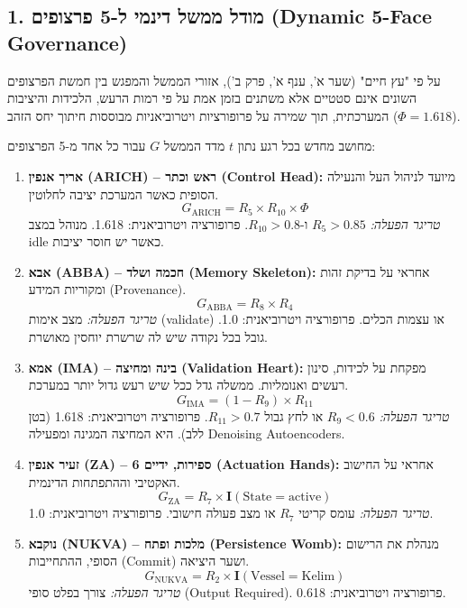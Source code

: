 \documentclass{article}
\begin{document}
\subsection{1. מודל ממשל דינמי ל-5 פרצופים (Dynamic 5-Face Governance)}
על פי "עץ חיים" (שער א', ענף א', פרק ב'), אזורי הממשל והמפגש בין חמשת הפרצופים השונים אינם סטטיים אלא משתנים בזמן אמת על פי רמות הרעש, הלכידות והיציבות המערכתית, תוך שמירה על פרופורציות ויטרוביאניות מבוססות חיתוך יחס הזהב ($\Phi = 1.618$).

מחושב מחדש בכל רגע נתון $t$ מדד הממשל $G$ עבור כל אחד מ-5 הפרצופים:

\begin{enumerate}
    \item \textbf{אריך אנפין (ARICH) -- ראש וכתר (Control Head):}
    מיועד לניהול העל והנעילה הסופית כאשר המערכת יציבה לחלוטין.
    \[ G_{\text{ARICH}} = R_5 \times R_{10} \times \Phi \]
    \textit{טריגר הפעלה:} $R_5 > 0.85$ ו-$R_{10} > 0.8$. פרופורציה ויטרוביאנית: 1.618. מנוהל במצב idle כאשר יש חוסר יציבות.

    \item \textbf{אבא (ABBA) -- חכמה ושלד (Memory Skeleton):}
    אחראי על בדיקת זהות ומקוריות המידע (Provenance).
    \[ G_{\text{ABBA}} = R_8 \times R_4 \]
    \textit{טריגר הפעלה:} מצב אימות (validate) או עצמות הכלים. פרופורציה ויטרוביאנית: 1.0. גובל בכל נקודה שיש לה שרשרת יוחסין מאושרת.

    \item \textbf{אמא (IMA) -- בינה ומחיצה (Validation Heart):}
    מפקחת על לכידות, סינון רעשים ואנומליות. ממשלה גדל ככל שיש רעש גדול יותר במערכת.
    \[ G_{\text{IMA}} = (1 - R_9) \times R_{11} \]
    \textit{טריגר הפעלה:} $R_9 < 0.6$ או לחץ גבול $R_{11} > 0.7$. פרופורציה ויטרוביאנית: 1.618 (בטן ללב). היא המחיצה המגינה ומפעילה Denoising Autoencoders.

    \item \textbf{זעיר אנפין (ZA) -- 6 ספירות, ידיים (Actuation Hands):}
    אחראי על החישוב האקטיבי וההתפתחות הדינמית.
    \[ G_{\text{ZA}} = R_7 \times \mathbf{I}(\text{State} = \text{active}) \]
    \textit{טריגר הפעלה:} עומס קריטי $R_7$ או מצב פעולה חישובי. פרופורציה ויטרוביאנית: 1.0.

    \item \textbf{נוקבא (NUKVA) -- מלכות ופתח (Persistence Womb):}
    מנהלת את הרישום הסופי, ההתחייבות (Commit) ושער היציאה.
    \[ G_{\text{NUKVA}} = R_2 \times \mathbf{I}(\text{Vessel} = \text{Kelim}) \]
    \textit{טריגר הפעלה:} צורך בפלט סופי (Output Required). פרופורציה ויטרוביאנית: 0.618.
\end{enumerate}
\end{document}
